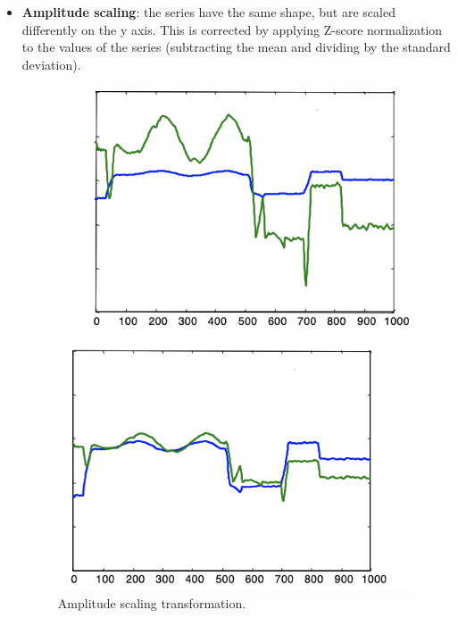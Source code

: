 \begin{itemize}
    \item \textbf{Amplitude scaling}: the series have the same shape, but are scaled differently on the y axis. This is corrected by applying Z-score normalization to the values of the series (subtracting the mean and dividing by the standard deviation).
    \begin{figure}[h]
        \centering
        \begin{minipage}{0.40\textwidth}
            \includegraphics[width=1.0\linewidth]{img/ampli_scaling_1.png}
        \end{minipage}
        \hfill
        \begin{minipage}{0.40\textwidth}
            \includegraphics[width=1.0\linewidth]{img/ampli_scaling_2.png}
        \end{minipage}
        \caption{Amplitude scaling transformation.}
        \label{fig:ampli-scaling}
    \end{figure}


\end{itemize}
